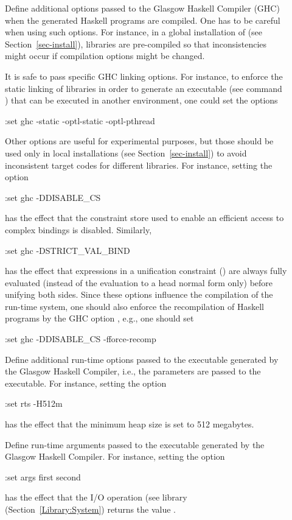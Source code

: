 \begin{description}
\item[]
Define additional options passed to the Glasgow Haskell Compiler (GHC)
when the generated Haskell programs are compiled.
One has to be careful when using such options.
For instance, in a global installation of \CYS
(see Section~\ref{sec-install}), libraries are pre-compiled
so that inconsistencies might occur if compilation options
might be changed.

It is safe to pass specific GHC linking options.
For instance, to enforce the static linking of libraries
in order to generate an executable (see command )
that can be executed in another environment, one could set the
options
\begin{curry}
:set ghc -static -optl-static -optl-pthread
\end{curry}

Other options are useful for experimental purposes,
but those should be used only in local installations
(see Section~\ref{sec-install}) to avoid inconsistent
target codes for different libraries.
For instance, setting the option
\begin{curry}
:set ghc -DDISABLE_CS
\end{curry}
has the effect that the constraint store used to enable
an efficient access to complex bindings is disabled.
Similarly,
\begin{curry}
:set ghc -DSTRICT_VAL_BIND
\end{curry}
has the effect that expressions in a unification constraint
(\code{=:=}) are always fully evaluated
(instead of the evaluation to a head normal form only)
before unifying both sides.
Since these options influence the compilation of the run-time system,
one should also enforce the recompilation of Haskell programs
by the GHC option , e.g., one should set
\begin{curry}
:set ghc -DDISABLE_CS -fforce-recomp
\end{curry}

\item[]
Define additional run-time options passed to the executable
generated by the Glasgow Haskell Compiler, i.e., the parameters
 are passed to the executable.
For instance, setting the option
\begin{curry}
:set rts -H512m
\end{curry}
has the effect that the minimum heap size is set to 512 megabytes.

\item[]
Define run-time arguments passed to the executable
generated by the Glasgow Haskell Compiler.
For instance, setting the option
\begin{curry}
:set args first second
\end{curry}
has the effect that the I/O operation 
(see library  (Section~\ref{Library:System})
returns the value .

\end{description}


